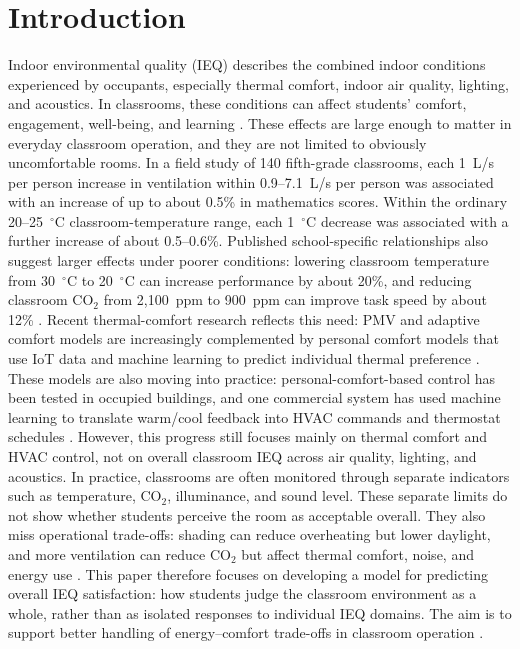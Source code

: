 ﻿\documentclass[11pt]{article}
\newcommand{\Reviewed}[1]{\begingroup\color{black}#1\endgroup}
\begin{document}
\Reviewed{
\section{Introduction}

Indoor environmental quality (IEQ) describes the combined indoor conditions experienced by occupants, especially thermal comfort, indoor air quality, lighting, and acoustics. In classrooms, these conditions can affect students' comfort, engagement, well-being, and learning \cite{carton2023iaqvec,sadick2017,carton2023primary,yang2020classroomieq,alam2025schoolieq}. These effects are large enough to matter in everyday classroom operation, and they are not limited to obviously uncomfortable rooms. In a field study of 140 fifth-grade classrooms, each 1~L/s per person increase in ventilation within 0.9--7.1~L/s per person was associated with an increase of up to about 0.5\% in mathematics scores. Within the ordinary 20--25~$^\circ$C classroom-temperature range, each 1~$^\circ$C decrease was associated with a further increase of about 0.5--0.6\%. Published school-specific relationships also suggest larger effects under poorer conditions: lowering classroom temperature from 30~$^\circ$C to 20~$^\circ$C can increase performance by about 20\%, and reducing classroom CO$_2$ from 2{,}100~ppm to 900~ppm can improve task speed by about 12\% \cite{haverinen2015testscore,wargocki2019temperature,wargocki2020airquality}. Recent thermal-comfort research reflects this need: PMV and adaptive comfort models are increasingly complemented by personal comfort models that use IoT data and machine learning to predict individual thermal preference \cite{kim2018newparadigm,kim2018,arakawa2022}. These models are also moving into practice: personal-comfort-based control has been tested in occupied buildings, and one commercial system has used machine learning to translate warm/cool feedback into HVAC commands and thermostat schedules \cite{xu2026pcmcontrol,baker2016comfy}. However, this progress still focuses mainly on thermal comfort and HVAC control, not on overall classroom IEQ across air quality, lighting, and acoustics. In practice, classrooms are often monitored through separate indicators such as temperature, CO$_2$, illuminance, and sound level. These separate limits do not show whether students perceive the room as acceptable overall. They also miss operational trade-offs: shading can reduce overheating but lower daylight, and more ventilation can reduce CO$_2$ but affect thermal comfort, noise, and energy use \cite{frontczak2012,heinzerling2013,zhao2023,zhang2023ieqmodels}. This paper therefore focuses on developing a model for predicting overall IEQ satisfaction: how students judge the classroom environment as a whole, rather than as isolated responses to individual IEQ domains. The aim is to support better handling of energy--comfort trade-offs in classroom operation \cite{wong2008,tang2022,roumi2022}.

}
\end{document}

